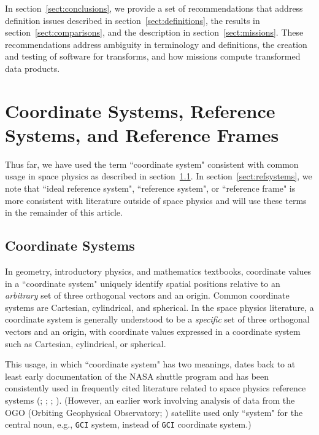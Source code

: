 \documentclass[draft]{agujournal2019}
\begin{document}
In section~\ref{sect:conclusions}, we provide a set of recommendations that address definition issues described in section~\ref{sect:definitions}, the results in section~\ref{sect:comparisons}, and the description in section~\ref{sect:missions}. These recommendations address ambiguity in terminology and definitions, the creation and testing of software for transforms, and how missions compute transformed data products.

\section{Coordinate Systems, Reference Systems, and Reference Frames}
\label{sect:terminology}

Thus far, we have used the term ``coordinate system" consistent with common usage in space physics as described in section~\ref{sect:coordsystems}. In section~\ref{sect:refsystems}, we note that ``ideal reference system", ``reference system", or ``reference frame" is more consistent with literature outside of space physics and will use these terms in the remainder of this article.

\subsection{Coordinate Systems}
\label{sect:coordsystems}

In geometry, introductory physics, and mathematics textbooks, coordinate values in a ``coordinate system" uniquely identify spatial positions relative to an {\it arbitrary} set of three orthogonal vectors and an origin. Common coordinate systems are Cartesian, cylindrical, and spherical. In the space physics literature, a coordinate system is generally understood to be a {\it specific} set of three orthogonal vectors and an origin, with coordinate values expressed in a coordinate system such as Cartesian, cylindrical, or spherical.

This usage, in which ``coordinate system" has two meanings, dates back to at least early documentation of the NASA shuttle program \cite{Davis1974} and has been consistently used in frequently cited literature related to space physics reference systems (; ; ; ). (However, an earlier work involving analysis of data from the OGO (Orbiting Geophysical Observatory; ) satellite used only ``system" for the central noun, e.g., \texttt{GCI} system, instead of \texttt{GCI} coordinate system.)
\end{document}
